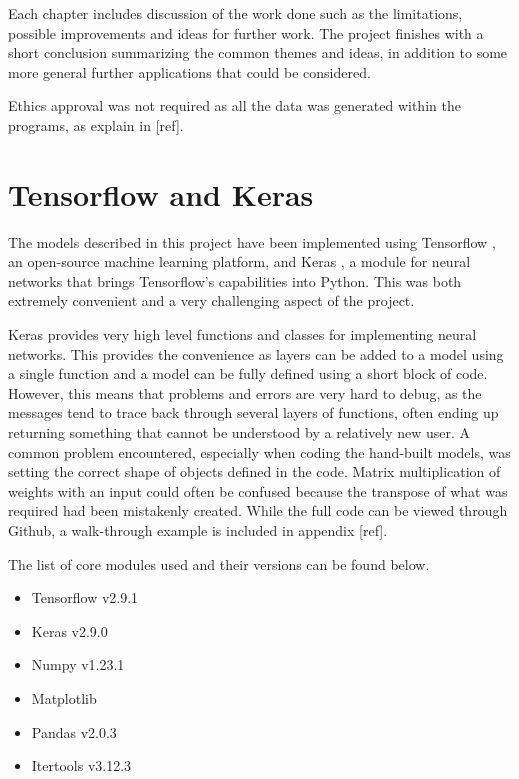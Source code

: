 \documentclass{somasmsc}
\begin{document}
Each chapter includes discussion of the work done such as the limitations, possible improvements and ideas for further work. The project finishes with a short conclusion summarizing the common themes and ideas, in addition to some more general further applications that could be considered.

Ethics approval was not required as all the data was generated within the programs, as explain in [ref].

\section{Tensorflow and Keras}

The models described in this project have been implemented using Tensorflow \citep{tensorflow2015-whitepaper}, an open-source machine learning platform, and Keras \citep{chollet2015keras}, a module for neural networks that brings Tensorflow's capabilities into Python. This was both extremely convenient and a very challenging aspect of the project.

Keras provides very high level functions and classes for implementing neural networks. This provides the convenience as layers can be added to a model using a single function and a model can be fully defined using a short block of code. However, this means that problems and errors are very hard to debug, as the messages tend to trace back through several layers of functions, often ending up returning something that cannot be understood by a relatively new user. A common problem encountered, especially when coding the hand-built models, was setting the correct shape of objects defined in the code. Matrix multiplication of weights with an input could often be confused because the transpose of what was required had been mistakenly created. While the full code can be viewed through Github, a walk-through example is included in appendix [ref].

The list of core modules used and their versions can be found below.

\begin{itemize}
    \item Tensorflow v2.9.1 \citep{tensorflow2015-whitepaper}
    \item Keras v2.9.0 \citep{chollet2015keras}
    \item Numpy v1.23.1 \citep{harris2020array}
    \item Matplotlib \citep{Hunter:2007}
    \item Pandas v2.0.3 \citep{mckinney-proc-scipy-2010}
    \item Itertools v3.12.3 \citep{van1995python}
\end{itemize}
\end{document}
